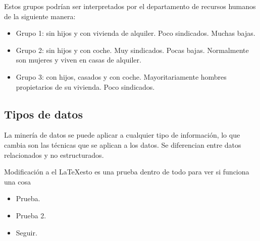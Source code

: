 \documentclass{article}
\begin{document}
Estos grupos podrían ser interpretados por el departamento de recursos humanos de la siguiente manera:
\begin{itemize}
\item Grupo 1: sin hijos y con vivienda de alquiler. Poco sindicados. Muchas bajas.
\item Grupo 2: sin hijos y con coche. Muy sindicados. Pocas bajas. Normalmente son mujeres y viven en casas de alquiler.
\item Grupo 3: con hijos, casados y con coche. Mayoritariamente hombres propietarios de su vivienda. Poco sindicados.
\end{itemize}


\subsection{Tipos de datos}

La minería de datos se puede aplicar a cualquier tipo de información, lo que cambia son las técnicas que se aplican a los datos. Se diferencian entre datos relacionados y no estructurados.


Modificación a el \LaTeX esto es una prueba dentro de todo para ver si funciona una cosa

\begin{itemize}
  \item Prueba.
  \item Prueba 2.
  \item Seguir.
\end{itemize}
\end{document}
